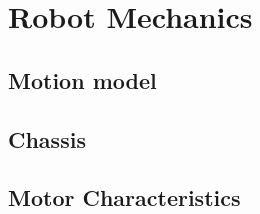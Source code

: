 \documentclass[Main]{subfiles}
\begin{document}
\section{Robot Mechanics} %
	\label{sec:robot_mechanics}


	\subsection{Motion model} %
		\label{sub:motion_model}
		

	\subsection{Chassis} %
		\label{sub:chassis}
		


	\subsection{Motor Characteristics} %
		\label{sub:motor_characteristics}
		
	



\end{document}
